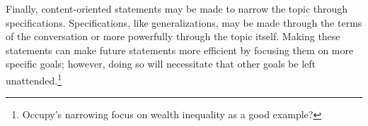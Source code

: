 \documentclass{article}
\begin{document}
Finally, content-oriented statements may be made to narrow the topic through specifications.
Specifications, like generalizations, may be made through the terms of the conversation or more powerfully through the topic itself.
Making these statements can make future statements more efficient by focusing them on more specific goals; however, doing so will necessitate that other goals be left unattended.\footnote{Occupy's narrowing focus on wealth inequality as a good example?}

\end{document}
